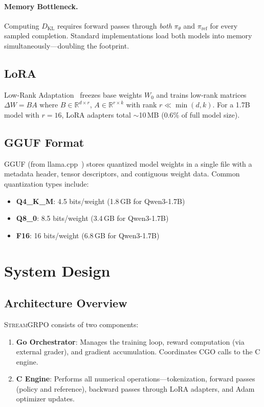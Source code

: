 \documentclass[sigconf,review,anonymous]{acmart}
\begin{document}
\paragraph{Memory Bottleneck.} Computing $D_{\text{KL}}$ requires forward passes through \emph{both} $\pi_\theta$ and $\pi_{\text{ref}}$ for every sampled completion. Standard implementations load both models into memory simultaneously---doubling the footprint.

\subsection{LoRA}

Low-Rank Adaptation~\cite{hu2021lora} freezes base weights $W_0$ and trains low-rank matrices $\Delta W = BA$ where $B \in \mathbb{R}^{d \times r}$, $A \in \mathbb{R}^{r \times k}$ with rank $r \ll \min(d,k)$. For a 1.7B model with $r=16$, LoRA adapters total $\sim$10\,MB (0.6\% of full model size).

\subsection{GGUF Format}

GGUF (from llama.cpp~\cite{llamacpp2023}) stores quantized model weights in a single file with a metadata header, tensor descriptors, and contiguous weight data. Common quantization types include:
\begin{itemize}
\item \textbf{Q4\_K\_M}: 4.5 bits/weight (1.8\,GB for Qwen3-1.7B)
\item \textbf{Q8\_0}: 8.5 bits/weight (3.4\,GB for Qwen3-1.7B)
\item \textbf{F16}: 16 bits/weight (6.8\,GB for Qwen3-1.7B)
\end{itemize}

\section{System Design}

\subsection{Architecture Overview}

\textsc{StreamGRPO} consists of two components:
\begin{enumerate}
\item \textbf{Go Orchestrator}: Manages the training loop, reward computation (via external grader), and gradient accumulation. Coordinates CGO calls to the C engine.
\item \textbf{C Engine}: Performs all numerical operations---tokenization, forward passes (policy and reference), backward passes through LoRA adapters, and Adam optimizer updates.
\end{enumerate}
\end{document}

